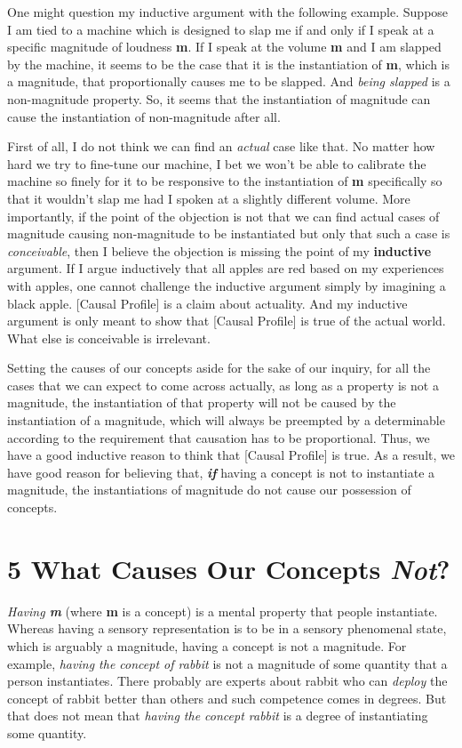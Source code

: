 \documentclass[a4paper,12pt]{article}
\begin{document}
One might question my inductive argument with the following example. Suppose I am tied to a machine which is designed to slap me if and only if I speak at a specific magnitude of loudness \textbf{m}. If I speak at the volume \textbf{m} and I am slapped by the machine, it seems to be the case that it is the instantiation of \textbf{m}, which is a magnitude, that proportionally causes me to be slapped. And \emph{being slapped} is a non-magnitude property. So, it seems that the instantiation of magnitude can cause the instantiation of non-magnitude after all.

First of all, I do not think we can find an \emph{actual} case like that. No matter how hard we try to fine-tune our machine, I bet we won't be able to calibrate the machine so finely for it to be responsive to the instantiation of \textbf{m} specifically so that it wouldn't slap me had I spoken at a slightly different volume. More importantly, if the point of the objection is not that we can find actual cases of magnitude causing non-magnitude to be instantiated but only that such a case is \emph{conceivable}, then I believe the objection is missing the point of my \textbf{inductive} argument. If I argue inductively that all apples are red based on my experiences with apples, one cannot challenge the inductive argument simply by imagining a black apple. [Causal Profile] is a claim about actuality. And my inductive argument is only meant to show that [Causal Profile] is true of the actual world. What else is conceivable is irrelevant.

Setting the causes of our concepts aside for the sake of our inquiry, for all the cases that we can expect to come across actually, as long as a property is not a magnitude, the instantiation of that property will not be caused by the instantiation of a magnitude, which will always be preempted by a determinable according to the requirement that causation has to be proportional. Thus, we have a good inductive reason to think that [Causal Profile] is true. As a result, we have good reason for believing that, \textbf{\emph{if}} having a concept is not to instantiate a magnitude, the instantiations of magnitude do not cause our possession of concepts.

\section*{5 What Causes Our Concepts \emph{Not}?}

\emph{Having \textbf{m}} (where \textbf{m} is a concept) is a mental property that people instantiate. Whereas having a sensory representation is to be in a sensory phenomenal state, which is arguably a magnitude, having a concept is not a magnitude. For example, \emph{having the concept of rabbit} is not a magnitude of some quantity that a person instantiates. There probably are experts about rabbit who can \emph{deploy} the concept of rabbit better than others and such competence comes in degrees. But that does not mean that \emph{having the concept rabbit} is a degree of instantiating some quantity.
\end{document}
